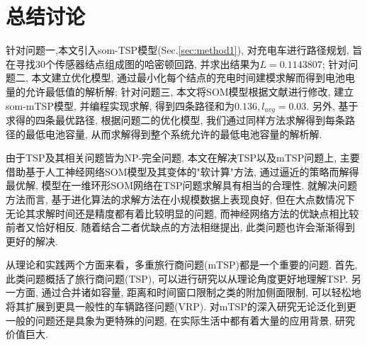 \section{总结讨论}

针对问题一,本文引入som-TSP模型(Sec.\ref{sec:method1}), 对充电车进行路径规划, 旨在寻找30个传感器结点组成图的哈密顿回路, 并求出结果为$L = 0.1143807$;
针对问题二, 本文建立优化模型, 通过最小化每个结点的充电时间建模求解而得到电池电量的允许最低值的解析解;
针对问题三, 本文将SOM模型根据文献\cite{som-mtsp}进行修改, 建立som-mTSP模型, 并编程实现求解, 得到四条路径和为$0.136, l_{avg} = 0.03$. 另外, 基于求得的四条最优路径, 根据问题二的优化模型, 我们通过同样方法求解得到每条路径的最低电池容量, 从而求解得到整个系统允许的最低电池容量的解析解.

由于TSP及其相关问题皆为NP-完全问题, 本文在解决TSP以及mTSP问题上, 主要借助基于人工神经网络SOM模型及其变体的"软计算"方法, 通过逼近的策略而解得最优解, 模型在一维环形SOM网络在TSP问题求解具有相当的合理性. 就解决问题方法而言, 基于进化算法的求解方法在小规模数据上表现良好, 但在大点数情况下无论其求解时间还是精度都有着比较明显的问题, 而神经网络方法的优缺点相比较前者又恰好相反. 随着结合二者优缺点的方法相继提出, 此类问题也许会渐渐得到更好的解决.

从理论和实践两个方面来看，多重旅行商问题(mTSP)都是一个重要的问题. 首先, 此类问题概括了旅行商问题(TSP), 可以进行研究以从理论角度更好地理解TSP. 另一方面, 通过合并诸如容量, 距离和时间窗口限制之类的附加侧面限制, 可以轻松地将其扩展到更具一般性的车辆路径问题(VRP). 对mTSP的深入研究无论泛化到更一般的问题还是具象为更特殊的问题, 在实际生活中都有着大量的应用背景, 研究价值巨大.



